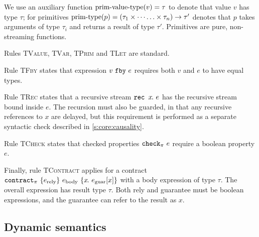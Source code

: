 \documentclass[a4paper,UKenglish,cleveref, autoref, thm-restate,anonymous]{lipics-v2021}
\begin{document}
We use an auxiliary function $\text{prim-value-type}(v) = \tau$ to denote that value $v$ has type $\tau$; for primitives $\text{prim-type}(p) = (\tau_1 \times \cdots \hdots \times \tau_n) \to \tau'$ denotes that $p$ takes arguments of type $\tau_i$ and returns a result of type $\tau'$.
Primitives are pure, non-streaming functions.

Rules \textsc{TValue}, \textsc{TVar}, \textsc{TPrim} and \textsc{TLet} are standard.

Rule \textsc{TFby} states that expression $v~\texttt{fby}~e$ requires both $v$ and $e$ to have equal types.

Rule \textsc{TRec} states that a recursive stream $\texttt{rec~} x\hspace{-0.1em}.~e$ has the recursive stream bound inside $e$.
The recursion must also be guarded, in that any recursive references to $x$ are delayed, but this requirement is performed as a separate syntactic check described in \autoref{s:core:causality}.

Rule \textsc{TCheck} states that checked properties $\texttt{check}_{\pi}~e$ require a boolean property $e$.

Finally, rule \textsc{TContract} applies for a contract $\texttt{contract}_{\pi}~\{e_{\text{rely}}\}~e_{\text{body}}~\{x\hspace{-0.1em}.~e_{\text{guar}}[x]\}$ with a body expression of type $\tau$.
The overall expression has result type $\tau$.
Both rely and guarantee must be boolean expressions, and the guarantee can refer to the result as $x$.

\subsection{Dynamic semantics}
\label{s:core:dynamic}
\end{document}
